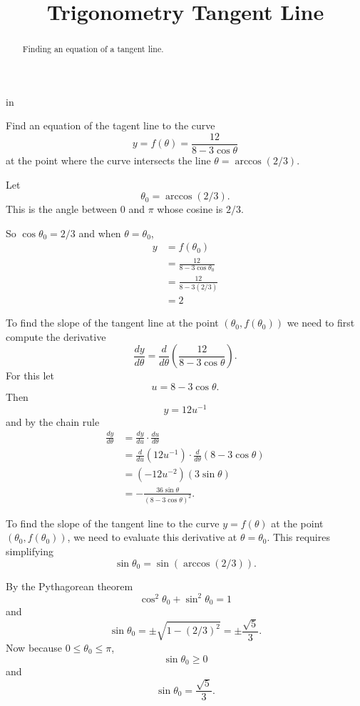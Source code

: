 \documentclass{ximera}
\title{Trigonometry Tangent Line}
\newcommand{\pskip}{\vskip 0.1 in}
\begin{document}
\begin{abstract}
Finding an equation of a tangent line.
\end{abstract}
\maketitle


\pskip



\begin{question}  \label{QKdftttfdrler33}
Find an equation of the tagent line to the curve
\[
       y  = f(\theta) = \frac{12}{8 - 3\cos\theta}
\]
at the point where the curve intersects the line $\theta =\arccos(2/3)$.

\begin{explanation}
Let 
\[
 \theta_0 = \arccos(2/3) .
\]
This is the angle between $0$ and $\pi$ whose cosine is $2/3$. 

So $\cos\theta_0 = 2/3$ and when $\theta=\theta_0$, 
\begin{align*}
y &= f(\theta_0)  \\
   &= \frac{12}{8 - 3\cos\theta_0} \\
   &= \frac{12}{8 - 3(2/3)} \\
   &=2
\end{align*}

To find the slope of the tangent line at the point $(\theta_0, f(\theta_0))$ we need to first compute the derivative
\[
   \frac{dy}{d\theta} = \frac{d}{d\theta}\left(  \frac{12}{8 - 3\cos\theta} \right) .
\]
For this let
\[
   u = 8 - 3\cos\theta .
\]
Then 
\[
   y = 12u^{-1}
\]
and by the chain rule
\begin{align*}
\frac{dy}{d\theta} &= \frac{dy}{du}\cdot \frac{du}{d\theta} \\
                           &= \frac{d}{du}\left( 12 u^{-1} \right) \cdot \frac{d}{d\theta}\left( 8 - 3\cos\theta \right) \\
                           &= (-12 u^{-2})(3\sin\theta) \\
                           & = -\frac{36\sin\theta}{(8 - 3\cos\theta)^2} .
\end{align*}

To find the slope of the tangent line to the curve $y=f(\theta)$ at the point $(\theta_0,f(\theta_0))$, we need to evaluate this derivative at $\theta = \theta_0$. This requires simplifying
\[
   \sin \theta_0 = \sin (\arccos(2/3)).
\]

By the Pythagorean theorem
\[
      \cos^2 \theta_0 + \sin^2\theta_0 = 1
\]
and
\[
   \sin\theta_0 = \pm \sqrt{1 -  (2/3)^2} =  \pm \frac{\sqrt{5}}{3} .
\]
Now because $0\leq \theta_0 \leq \pi$, 
\[
 \sin\theta_0 \geq 0
\]
and 
\[
    \sin\theta_0 =  \frac{\sqrt{5}}{3}.
\]


\end{explanation}
\end{question}
\end{document}
